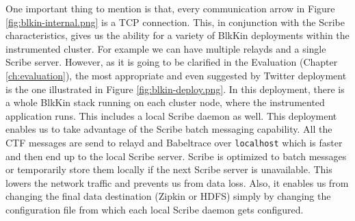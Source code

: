 One important thing to mention is that, every communication arrow in Figure
\ref{fig:blkin-internal.png} is a TCP connection. This, in conjunction with the
Scribe characteristics, gives us the ability for a variety of BlkKin deployments
within the instrumented cluster. For example we can have multiple relayds and a
single Scribe server. However, as it is going to be clarified in the Evaluation
(Chapter \ref{ch:evaluation}), the most appropriate and even suggested by
Twitter deployment is the one illustrated in Figure \ref{fig:blkin-deploy.png}.
In this deployment, there is a whole BlkKin stack running on each cluster node,
where the instrumented application runs. This includes a local Scribe daemon as
well. This deployment enables us to take advantage of the Scribe batch messaging
capability. All the CTF messages are send to relayd and Babeltrace over
\texttt{localhost} which is faster and then end up to the local Scribe server.
Scribe is optimized to batch messages or temporarily store them locally if the
next Scribe server is unavailable. This lowers the network traffic and prevents
us from data loss. Also, it enables us from changing the final data destination
(Zipkin or HDFS) simply by changing the configuration file from which each local
Scribe daemon gets configured. 

